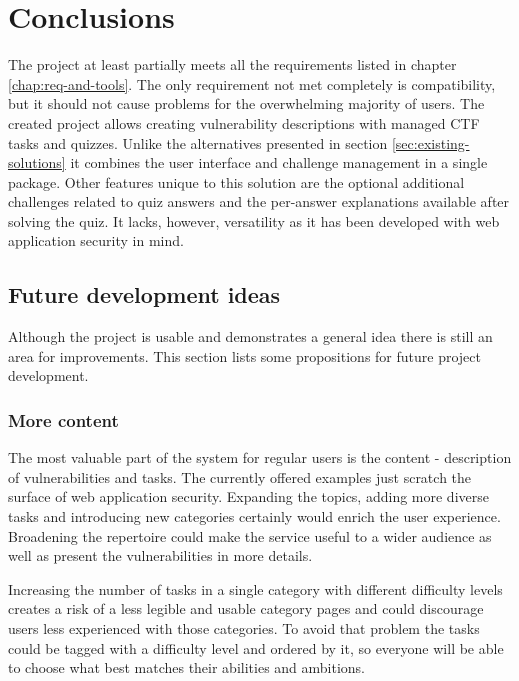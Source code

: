 \chapter{Conclusions}

The project at least partially meets all the requirements listed in chapter \ref{chap:req-and-tools}. The only requirement not met completely is compatibility, but it should not cause problems for the overwhelming majority of users. The created project allows creating vulnerability descriptions with managed CTF tasks and quizzes. Unlike the alternatives presented in section \ref{sec:existing-solutions} it combines the user interface and challenge management in a single package. Other features unique to this solution are the optional additional challenges related to quiz answers and the per-answer explanations available after solving the quiz. It lacks, however, versatility as it has been developed with web application security in mind.

\section{Future development ideas}

Although the project is usable and demonstrates a general idea there is still an area for improvements. This section lists some propositions for future project development.

\subsection{More content}

The most valuable part of the system for regular users is the content - description of vulnerabilities and tasks. The currently offered examples just scratch the surface of web application security. Expanding the topics, adding more diverse tasks and introducing new categories certainly would enrich the user experience. Broadening the repertoire could make the service useful to a wider audience as well as present the vulnerabilities in more details.

Increasing the number of tasks in a single category with different difficulty levels creates a risk of a less legible and usable category pages and could discourage users less experienced with those categories. To avoid that problem the tasks could be tagged with a difficulty level and ordered by it, so everyone will be able to choose what best matches their abilities and ambitions.

